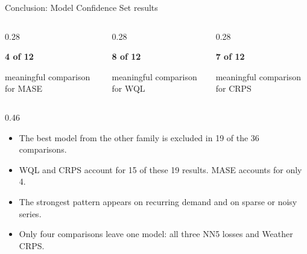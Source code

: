 \documentclass[aspectratio=169,10pt]{beamer}
\newcommand{\tagbox}[2]{%
  \tikz[baseline=(tag.base)]{%
    \node[fill=#1,rounded corners=1.5pt,inner xsep=4pt,inner ysep=3pt]
      (tag) {\strut #2};
  }%
}
\begin{document}
\begin{frame}{Conclusion: Model Confidence Set results}
  \vspace{0.04cm}
  \begin{columns}[T,totalwidth=0.92\linewidth]
    \begin{column}{0.28\linewidth}
      \colorbox{TealLight}{\parbox{0.90\linewidth}{\centering
        \fontsize{15}{17}\selectfont\bfseries 4 of 12\par
        \scriptsize meaningful comparison for MASE}}
    \end{column}
    \begin{column}{0.28\linewidth}
      \colorbox{PurpleLight}{\parbox{0.90\linewidth}{\centering
        \fontsize{15}{17}\selectfont\bfseries 8 of 12\par
        \scriptsize meaningful comparison for WQL}}
    \end{column}
    \begin{column}{0.28\linewidth}
      \colorbox{GreenLight}{\parbox{0.90\linewidth}{\centering
        \fontsize{15}{17}\selectfont\bfseries 7 of 12\par
        \scriptsize meaningful comparison for CRPS}}
    \end{column}
  \end{columns}

  \vspace{0.20cm}
  \begin{columns}[T,totalwidth=0.93\linewidth]
    \begin{column}{0.46\linewidth}
      \tagbox{PurpleLight}{\textbf{Main pattern}}
      \vspace{0.10cm}

      \fontsize{8.2}{9.5}\selectfont
      \begin{itemize}\setlength{\itemsep}{0.10cm}
        \item The best model from the other family is excluded in 19 of the 36
          comparisons.
        \item WQL and CRPS account for 15 of these 19 results. MASE accounts
          for only 4.
        \item The strongest pattern appears on recurring demand and on sparse
          or noisy series.
        \item Only four comparisons leave one model: all three NN5 losses and
          Weather CRPS.
      \end{itemize}
    \end{column}


\end{columns}
\end{frame}
\end{document}
